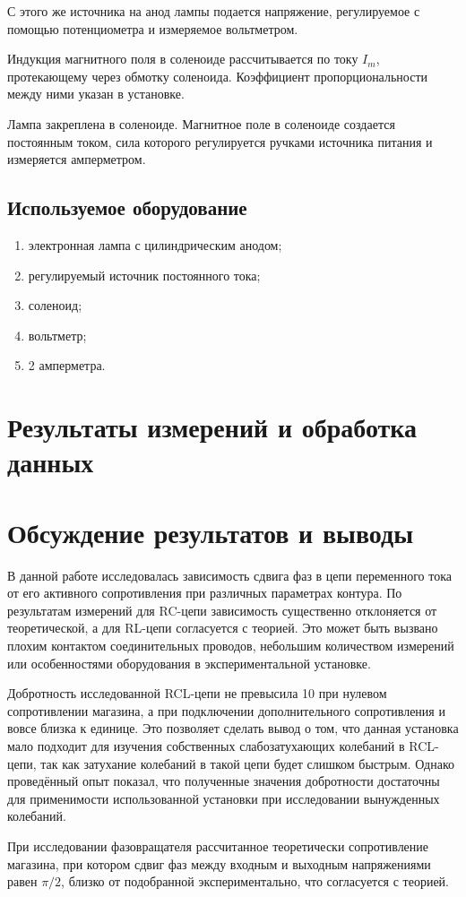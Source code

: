\documentclass[a4paper, 12pt]{article}
\begin{document}
С этого же источника на анод лампы подается напряжение, регулируемое с помощью потенциометра и измеряемое вольтметром.

Индукция магнитного поля в соленоиде рассчитывается по току $I_m$, протекающему через обмотку соленоида. Коэффициент пропорциональности между ними указан в установке.

Лампа закреплена в соленоиде. Магнитное поле в соленоиде создается постоянным током, сила которого регулируется ручками источника питания и измеряется амперметром.

\subsection{Используемое оборудование}

\begin{enumerate}
    \item электронная лампа с цилиндрическим анодом;
    \item регулируемый источник постоянного тока;
    \item соленоид;
    \item вольтметр;
    \item 2 амперметра.
\end{enumerate}

\section{Результаты измерений и обработка данных}



\section{Обсуждение результатов и выводы}

В данной работе исследовалась зависимость сдвига фаз в цепи переменного тока от его активного сопротивления при различных параметрах контура. По результатам измерений для RC-цепи зависимость существенно отклоняется от теоретической, а для RL-цепи согласуется с теорией. Это может быть вызвано плохим контактом соединительных проводов, небольшим количеством измерений или особенностями оборудования в экспериментальной установке.

Добротность исследованной RCL-цепи не превысила 10 при нулевом сопротивлении магазина, а при подключении дополнительного сопротивления и вовсе близка к единице. Это позволяет сделать вывод о том, что данная установка мало подходит для изучения собственных слабозатухающих колебаний в RCL-цепи, так как затухание колебаний в такой цепи будет слишком быстрым. Однако проведённый опыт показал, что полученные значения добротности достаточны для применимости использованной установки при исследовании вынужденных колебаний.

При исследовании фазовращателя рассчитанное теоретически сопротивление магазина, при котором сдвиг фаз между входным и выходным напряжениями равен $\pi/2$, близко от подобранной экспериментально, что согласуется с теорией.
\end{document}
